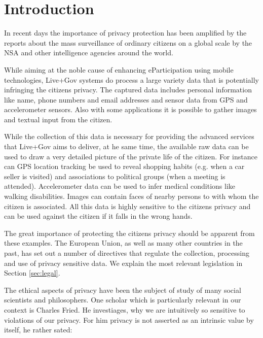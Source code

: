 \documentclass[external]{20120615_deliverable_template_ukob}
\theoremstyle{definition}
\begin{document}
\setcounter{tocdepth}{2}

\LGTOC

\newpage
\newcommand{\todo}[2]{\textcolor{magenta}{#1: #2}}

\chapter{Introduction}\label{chap:Introduction}
In recent days the importance of privacy protection has been amplified
by the reports about the mass surveillance of ordinary citizens on a
global scale by the NSA and other intelligence agencies around the
world.

While aiming at the noble cause of enhancing eParticipation using
mobile technologies, Live+Gov systems do process a large variety data
that is potentially infringing the citizens privacy. The captured data
includes personal information like name, phone numbers and email
addresses and sensor data from GPS and accelerometer sensors. Also
with some applications it is possible to gather images and textual
input from the citizen.

While the collection of this data is necessary for providing the
advanced services that Live+Gov aims to deliver, at he same time, the
available raw data can be used to draw a very detailed picture of the
private life of the citizen. For instance can GPS location tracking be
used to reveal shopping habits (e.g. when a car seller is visited) and
associations to political groups (when a meeting is
attended). Accelerometer data can be used to infer medical conditions
like walking disabilities. Images can contain faces of nearby persons
to with whom the citizen is associated. All this data is highly
sensitive to the citizens privacy and can be used against the citizen
if it falls in the wrong hands.

The great importance of protecting the citizens privacy should be
apparent from these examples. The European Union, as well as many
other countries in the past, has set out a number of directives that
regulate the collection, processing and use of privacy sensitive
data. We explain the most relevant legislation in Section
\ref{sec:legal}.

The ethical aspects of privacy have been the subject of study of many
social scientists and philosophers. One scholar which is particularly
relevant in our context is Charles Fried. He investiages, why we are
intuitively so sensitive to violations of our privacy. For him privacy
is not asserted as an intrinsic value by itself, he rather sated:
\end{document}
